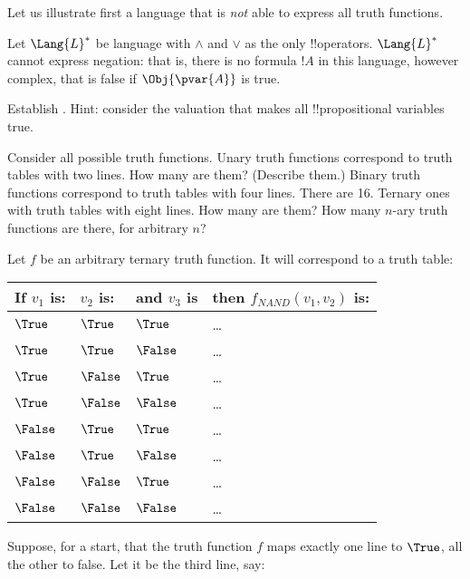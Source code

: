 \documentclass[../../../include/open-logic-section]{subfiles}
\begin{document}
Let us illustrate first a language that is \emph{not} able to express
all truth functions. 

\begin{prop} 
    Let $\Lang{L}^*$ be language with $\land$ and $\lor$ as the only
    !!{operator}s. $\Lang{L}^*$ cannot express negation:
    that is, there is no formula $!A$ in
    this language, however complex, that is false if $\Obj{\pvar{A}}$
    is true.
\end{prop}

\begin{prob}
    Establish . Hint: consider
    the valuation that makes all !!{propositional variable}s true.
\end{prob}
    
Consider all possible truth functions. Unary truth functions correspond
to truth tables with two lines. How many are them? (Describe them.)
Binary truth functions correspond to truth tables with four lines.
There are 16. Ternary ones with truth tables with eight lines. How 
many are them? How many $n$-ary truth functions are there, for 
arbitrary $n$?

Let $f$ be an arbitrary ternary truth function. It will correspond 
to a truth table:

\smallskip \noindent
\begin{tabular}{llll}
    If $v_1$ is: & $v_2$ is: & and $v_3$ is & then $f_{NAND}(v_1,v_2)$ is: \\
    \hline
    $\True$ & $\True$ & $\True$ & \dots \\
    $\True$ & $\True$ & $\False$ & \dots \\
    $\True$ & $\False$ & $\True$ & \dots \\
    $\True$ & $\False$ & $\False$ & \dots \\
    $\False$ & $\True$ & $\True$ & \dots \\
    $\False$ & $\True$ & $\False$ & \dots \\
    $\False$ & $\False$ & $\True$ & \dots \\
    $\False$ & $\False$ & $\False$ & \dots \\
\end{tabular}
\smallskip

Suppose, for a start, that the truth function $f$ maps exactly one line
to $\True$, all the other to false. Let it be the third line, say:
\end{document}
